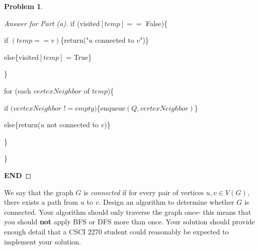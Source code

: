\documentclass[11pt]{article}
\theoremstyle{definition}
\theoremstyle{definition}
\newtheorem{required}{Problem}
\theoremstyle{definition}
\begin{document}
\begin{required}
\begin{enumerate}[label=(\alph*)]
\begin{proof}[Answer for Part (a)]
\item	\hspace*{20mm} if (visited$[temp] ==$ False)\{
\item	\hspace*{30mm} if $(temp == v)$\{return("$u$ connected to $v$")\}
\item	\hspace*{30mm} else\{visited$[temp]$ = True\}
\item	\hspace*{20mm} \}
\item	\hspace*{10mm} for (each $vertexNeighbor$ of $temp$)\{
\item	\hspace*{20mm} if $(vertexNeighbor$ $!= empty)$\{enqueue$(Q, vertexNeighbor)$\}
\item	\hspace*{20mm} else\{return($u$ not connected to $v$)\}
\item	\hspace*{10mm} \}
\item	\hspace*{0mm} \}
\item \textbf{END}
\end{proof}



\newpage
\item We say that the graph $G$ is \textit{connected} if for every pair of vertices $u, v \in V(G)$, there exists a path from $u$ to $v$. Design an algorithm to determine whether $G$ is connected. Your algorithm should only traverse the graph once- this means that you should \textbf{not} apply BFS or DFS more than once. Your solution should provide enough detail that a CSCI 2270 student could reasonably be expected to implement your solution.


\end{enumerate}
\end{required}
\end{document}
